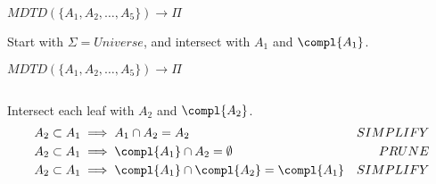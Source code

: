 




\begin{frame}[t]{$MDTD( \{A_1, A_2, \ldots, A_5\})\to\Pi$}
  \scalebox{2.0}{\usebox\boxforestE}
  
  \medskip
  
  Start with $\Sigma=Universe$, and intersect with $A_1$ and $\compl{A_1}$.
\end{frame}



\begin{frame}[t]{$MDTD( \{A_1, A_2, \ldots, A_5\})\to\Pi$}
  \begin{columns}
    \begin{column}{0.6\textwidth}
      \scalebox{1.5}{\usebox\boxforestD}%
    \end{column}
    \begin{column}{0.4\textwidth}
      {\scalebox{0.7}{}}%
    \end{column}
  \end{columns}%
  
  Intersect each leaf with $A_2$ and $\compl{A_2}$.
  \begin{align*}
    A_2 \subset A_1 &\implies A_1\cap A_2 = A_2 & SIMPLIFY\\
    A_2 \subset A_1 &\implies \compl{A_1}\cap A_2 = \emptyset & PRUNE\\
    A_2 \subset A_1 &\implies \compl{A_1}\cap \compl{A_2} = \compl{A_1} & SIMPLIFY
  \end{align*}
\end{frame}

  
  
  
  

